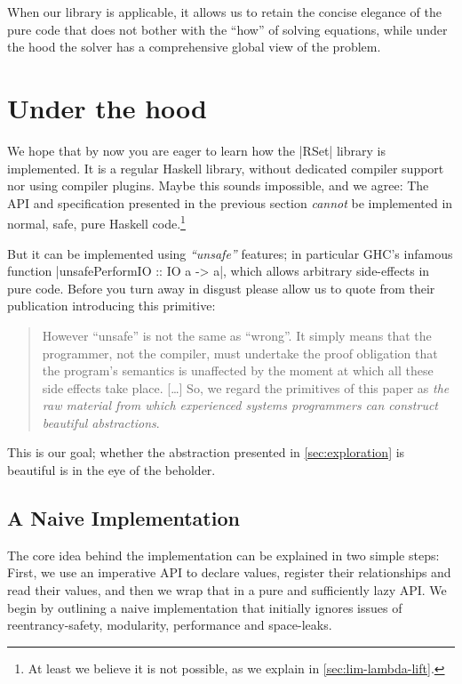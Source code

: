 \documentclass[manuscript,screen,acmsmall,nonacm]{acmart}
\begin{document}
When our library is applicable, it allows us to retain the concise elegance of the pure code that does not bother with the “how” of solving equations, while under the hood the solver has a comprehensive global view of the problem.


\section{Under the hood}\label{sec:impl}

We hope that by now you are eager to learn how the |RSet| library is implemented. It is a regular Haskell library, without dedicated compiler support nor using compiler plugins. Maybe this sounds impossible, and we agree: The API and specification presented in the previous section \emph{cannot} be implemented in normal, safe, pure Haskell code.\footnote{At least we believe it is not possible, as we explain in \cref{sec:lim-lambda-lift}.}

But it can be implemented using \emph{“unsafe”} features; in particular GHC's infamous function |unsafePerformIO :: IO a -> a|, which allows arbitrary side-effects in pure code. Before you turn away in disgust please allow us to quote \citet{unsafePerformIO} from their publication introducing this primitive:
\begin{quote}
However “unsafe” is not the same as “wrong”. It simply means that the programmer, not the compiler, must undertake the proof obligation that the program's semantics is unaffected by the moment at which all these side effects take place. [\ldots]
So, we regard the primitives of this paper as \emph{the raw material from which experienced systems programmers can construct beautiful abstractions}.
\end{quote}
This is our goal; whether the abstraction presented in \cref{sec:exploration} is beautiful is in the eye of the beholder.

\subsection{A Naive Implementation}

The core idea behind the implementation can be explained in two simple steps: First, we use an imperative API to declare values, register their relationships and read their values, and then we wrap that in a pure and sufficiently lazy API. We begin by outlining a naive implementation that initially ignores issues of reentrancy-safety, modularity, performance and space-leaks.
\end{document}
